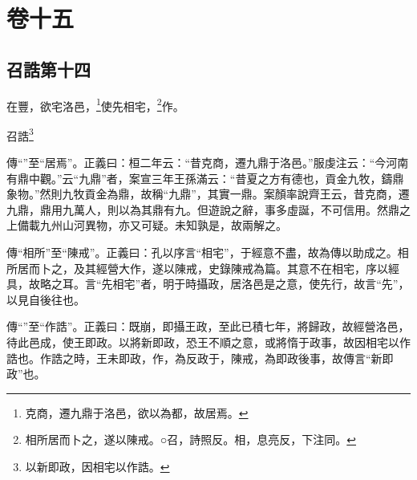 

\chapter{卷十五}


\section{召誥第十四}


在豐，欲宅洛邑，\footnote{克商，遷九鼎于洛邑，欲以為都，故居焉。}使先相宅，\footnote{相所居而卜之，遂以陳戒。○召，詩照反。相，息亮反，下注同。}作。

召誥\footnote{以新即政，因相宅以作誥。}


{\noindent\zhuan{}\fzbyks 傳“”至“居焉”。正義曰：桓二年云：“昔克商，遷九鼎于洛邑。”服虔注云：“今河南有鼎中觀。”云“九鼎”者，案宣三年王孫滿云：“昔夏之方有德也，貢金九牧，鑄鼎象物。”然則九牧貢金為鼎，故稱“九鼎”，其實一鼎。案顏率說齊王云，昔克商，遷九鼎，鼎用九萬人，則以為其鼎有九。但遊說之辭，事多虛誕，不可信用。然鼎之上備載九州山河異物，亦又可疑。未知孰是，故兩解之。 \par}

{\noindent\zhuan{}\fzbyks 傳“相所”至“陳戒”。正義曰：孔以序言“相宅”，于經意不盡，故為傳以助成之。相所居而卜之，及其經營大作，遂以陳戒，史錄陳戒為篇。其意不在相宅，序以經具，故略之耳。言“先相宅”者，明于時攝政，居洛邑是之意，使先行，故言“先”，以見自後往也。 \par}

{\noindent\zhuan{}\fzbyks 傳“”至“作誥”。正義曰：既崩，即攝王政，至此已積七年，將歸政，故經營洛邑，待此邑成，使王即政。以將新即政，恐王不順之意，或將惰于政事，故因相宅以作誥也。作誥之時，王未即政，作，為反政于，陳戒，為即政後事，故傳言“新即政”也。 \par}

